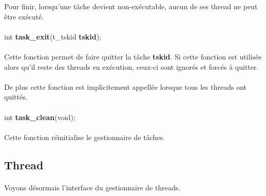 \documentclass[10pt,a4wide]{article}
\begin{document}
Pour finir, lorsqu'une t\^ache devient non-ex\'ecutable, aucun de ses
thread ne peut \^etre ex\'ecut\'e.

\paragraph{}

\hspace{1.5cm}int \textbf{task\_exit}(t\_tskid \textbf{tskid});

\paragraph{}

Cette fonction permet de faire quitter la t\^ache \textbf{tskid}.
Si cette fonction est utilis\'ee alors qu'il reste des threads
en ex\'ecution, ceux-ci sont ignor\'es et forc\'es \`a quitter.

\paragraph{}

De plus cette fonction est implicitement appell\'ee lorsque tous
les threads ont quitt\'es.

\paragraph{}

\hspace{1.5cm}int \textbf{task\_clean}(void);

\paragraph{}

Cette fonction r\'einitialise le gestionnaire de t\^aches.

\subsection{Thread}

\paragraph{}

Voyons d\'esormais l'interface du gestionnaire de threads.

\paragraph{}
\end{document}
